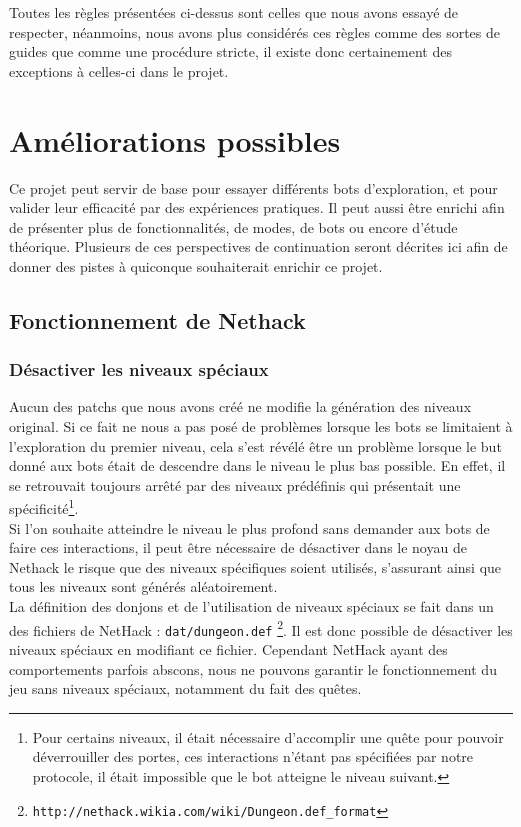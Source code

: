 \documentclass[a4paper,12pt]{article}
\begin{document}
Toutes les règles présentées ci-dessus sont celles que nous avons essayé de
respecter, néanmoins, nous avons plus considérés ces règles comme des sortes de
guides que comme une procédure stricte, il existe donc certainement des
exceptions à celles-ci dans le projet.

\section{Améliorations possibles}
Ce projet peut servir de base pour essayer différents bots d'exploration,
et pour valider leur efficacité par des expériences pratiques. Il peut aussi
être enrichi afin de présenter plus de fonctionnalités, de modes, de bots ou
encore d'étude théorique. Plusieurs de ces perspectives de continuation seront
décrites ici afin de donner des pistes à quiconque souhaiterait enrichir ce
projet.

\subsection{Fonctionnement de Nethack}
\subsubsection{Désactiver les niveaux spéciaux}
Aucun des patchs que nous avons créé ne modifie la génération des niveaux
original. Si ce fait ne nous a pas posé de problèmes lorsque les bots se
limitaient à l'exploration du premier niveau, cela s'est révélé être un problème
lorsque le but donné aux bots était de descendre dans le niveau le plus bas
possible. En effet, il se retrouvait toujours arrêté par des niveaux prédéfinis
qui présentait une spécificité\footnote{Pour certains niveaux, il était
nécessaire d'accomplir une quête pour pouvoir déverrouiller des portes, ces
interactions n'étant pas spécifiées par notre protocole, il était impossible que
le bot atteigne le niveau suivant.}.
\\
Si l'on souhaite atteindre le niveau le plus profond sans demander aux bots de
faire ces interactions, il peut être nécessaire de désactiver dans le noyau de
Nethack le risque que des niveaux spécifiques soient utilisés, s'assurant ainsi
que tous les niveaux sont générés aléatoirement.
\\
La définition des donjons et de l'utilisation de niveaux spéciaux se fait dans
un des fichiers de NetHack : \verb!dat/dungeon.def!
\footnote{\verb!http://nethack.wikia.com/wiki/Dungeon.def_format!}. Il
est donc possible de désactiver les niveaux spéciaux en modifiant ce fichier.
Cependant NetHack ayant des comportements parfois abscons, nous ne pouvons
garantir le fonctionnement du jeu sans niveaux spéciaux, notamment du fait des
quêtes.
\end{document}
